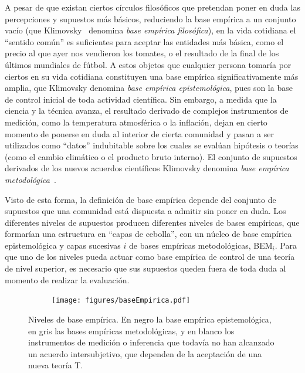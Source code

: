 \documentclass[a4paper,11pt]{book}
\theoremstyle{definition}
\begin{document}

A pesar de que existan ciertos c\'irculos filos\'oficos que pretendan poner en duda las percepciones y supuestos m\'as b\'asicos, reduciendo la base emp\'irica a un conjunto vac\'io (que Klimovsky~\cite{klimovsky1994-desventuras} denomina \emph{base emp\'irica filos\'ofica}), en la vida cotidiana el ``sentido com\'un'' es suficientes para aceptar las entidades m\'as b\'asica, como el precio al que ayer nos vendieron los tomates, o el resultado de la final de los \'ultimos mundiales de f\'utbol.
%
A estos objetos que cualquier persona tomar\'ia por ciertos en su vida cotidiana constituyen una base emp\'irica significativamente m\'as amplia, que Klimovsky denomina \emph{base emp\'irica epistemol\'ogica}, pues son la base de control inicial de toda actividad cient\'ifica.
%
Sin embargo, a medida que la ciencia y la t\'ecnica avanza, el resultado derivado de complejos instrumentos de medici\'on, como la temperatura atmosf\'erica o la inflaci\'on, dejan en cierto momento de ponerse en duda al interior de cierta comunidad y pasan a ser utilizados como ``datos'' indubitable sobre los cuales se eval\'uan hip\'otesis o teor\'ias (como el cambio clim\'atico o el producto bruto interno).
%
El conjunto de supuestos derivados de los nuevos acuerdos cient\'ificos Klimovsky denomina \emph{base emp\'irica metodol\'ogica}~\cite{klimovsky1994-desventuras}.


Visto de esta forma, la definici\'on de base emp\'irica depende del conjunto de supuestos que una comunidad est\'a dispuesta a admitir sin poner en duda.
%
Los diferentes niveles de supuestos producen diferentes niveles de bases emp\'iricas, que formar\'ian una estructura en ``capas de cebolla'', con un n\'ucleo de base emp\'irica epistemol\'ogica y capas sucesivas $i$ de bases emp\'iricas metodol\'ogicas, BEM$_i$.
%
Para que uno de los niveles pueda actuar como base emp\'irica de control de una teor\'ia de nivel superior, es necesario que sus supuestos queden fuera de toda duda al momento de realizar la evaluaci\'on.
%
\begin{figure}[ht!]
    \centering
    \begin{subfigure}[b]{0.48\textwidth}
    \texttt{[image: figures/baseEmpirica.pdf]}
    \end{subfigure}
    \caption{Niveles de base emp\'irica. En negro la base emp\'irica epistemol\'ogica, en gris las bases emp\'iricas metodol\'ogicas, y en blanco los instrumentos de medici\'on o inferencia que todav\'ia no han alcanzado un acuerdo intersubjetivo, que dependen de la aceptaci\'on de una nueva teor\'ia T.}
\end{figure}
\end{document}
